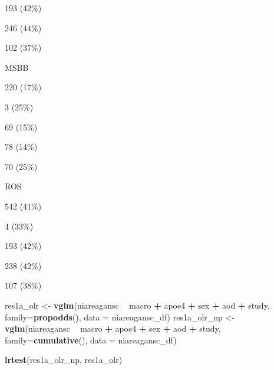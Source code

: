 \documentclass[]{book}
\newenvironment{Shaded}{\begin{snugshade}}{\end{snugshade}}
\newcommand{\DataTypeTok}[1]{\textcolor[rgb]{0.13,0.29,0.53}{#1}}
\newcommand{\KeywordTok}[1]{\textcolor[rgb]{0.13,0.29,0.53}{\textbf{#1}}}
\newcommand{\NormalTok}[1]{#1}
\newcommand{\OperatorTok}[1]{\textcolor[rgb]{0.81,0.36,0.00}{\textbf{#1}}}
\newcommand{\StringTok}[1]{\textcolor[rgb]{0.31,0.60,0.02}{#1}}
\begin{document}
193 (42\%)

246 (44\%)

102 (37\%)

MSBB

220 (17\%)

3 (25\%)

69 (15\%)

78 (14\%)

70 (25\%)

ROS

542 (41\%)

4 (33\%)

193 (42\%)

238 (42\%)

107 (38\%)

\begin{Shaded}
\end{Shaded}

\begin{Shaded}
\begin{Highlighting}[]
\NormalTok{res1a_olr <-}\StringTok{ }\KeywordTok{vglm}\NormalTok{(niareagansc }\OperatorTok{~}\StringTok{ }\NormalTok{macro }\OperatorTok{+}\StringTok{ }\NormalTok{apoe4 }\OperatorTok{+}\StringTok{ }\NormalTok{sex }\OperatorTok{+}\StringTok{ }\NormalTok{aod }\OperatorTok{+}\StringTok{ }\NormalTok{study, }
                  \DataTypeTok{family=}\KeywordTok{propodds}\NormalTok{(), }\DataTypeTok{data =}\NormalTok{ niareagansc_df)}
\NormalTok{res1a_olr_np <-}\StringTok{ }\KeywordTok{vglm}\NormalTok{(niareagansc }\OperatorTok{~}\StringTok{ }\NormalTok{macro }\OperatorTok{+}\StringTok{ }\NormalTok{apoe4 }\OperatorTok{+}\StringTok{ }\NormalTok{sex }\OperatorTok{+}\StringTok{ }\NormalTok{aod }\OperatorTok{+}\StringTok{ }\NormalTok{study, }
                     \DataTypeTok{family=}\KeywordTok{cumulative}\NormalTok{(), }\DataTypeTok{data =}\NormalTok{ niareagansc_df)}

\KeywordTok{lrtest}\NormalTok{(res1a_olr_np, res1a_olr)}
\end{Highlighting}
\end{Shaded}
\end{document}
